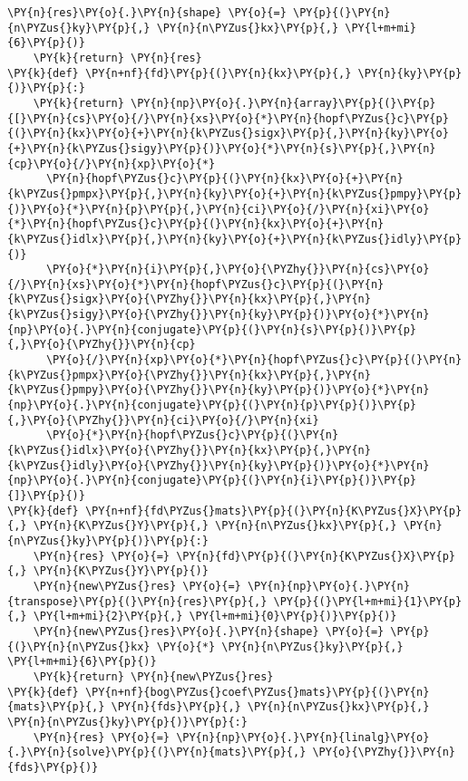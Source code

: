 \begin{Verbatim}[commandchars=\\\{\}]
    \PY{n}{res}\PY{o}{.}\PY{n}{shape} \PY{o}{=} \PY{p}{(}\PY{n}{n\PYZus{}ky}\PY{p}{,} \PY{n}{n\PYZus{}kx}\PY{p}{,} \PY{l+m+mi}{6}\PY{p}{)}
    \PY{k}{return} \PY{n}{res}
\PY{k}{def} \PY{n+nf}{fd}\PY{p}{(}\PY{n}{kx}\PY{p}{,} \PY{n}{ky}\PY{p}{)}\PY{p}{:}
    \PY{k}{return} \PY{n}{np}\PY{o}{.}\PY{n}{array}\PY{p}{(}\PY{p}{[}\PY{n}{cs}\PY{o}{/}\PY{n}{xs}\PY{o}{*}\PY{n}{hopf\PYZus{}c}\PY{p}{(}\PY{n}{kx}\PY{o}{+}\PY{n}{k\PYZus{}sigx}\PY{p}{,}\PY{n}{ky}\PY{o}{+}\PY{n}{k\PYZus{}sigy}\PY{p}{)}\PY{o}{*}\PY{n}{s}\PY{p}{,}\PY{n}{cp}\PY{o}{/}\PY{n}{xp}\PY{o}{*}
      \PY{n}{hopf\PYZus{}c}\PY{p}{(}\PY{n}{kx}\PY{o}{+}\PY{n}{k\PYZus{}pmpx}\PY{p}{,}\PY{n}{ky}\PY{o}{+}\PY{n}{k\PYZus{}pmpy}\PY{p}{)}\PY{o}{*}\PY{n}{p}\PY{p}{,}\PY{n}{ci}\PY{o}{/}\PY{n}{xi}\PY{o}{*}\PY{n}{hopf\PYZus{}c}\PY{p}{(}\PY{n}{kx}\PY{o}{+}\PY{n}{k\PYZus{}idlx}\PY{p}{,}\PY{n}{ky}\PY{o}{+}\PY{n}{k\PYZus{}idly}\PY{p}{)}
      \PY{o}{*}\PY{n}{i}\PY{p}{,}\PY{o}{\PYZhy{}}\PY{n}{cs}\PY{o}{/}\PY{n}{xs}\PY{o}{*}\PY{n}{hopf\PYZus{}c}\PY{p}{(}\PY{n}{k\PYZus{}sigx}\PY{o}{\PYZhy{}}\PY{n}{kx}\PY{p}{,}\PY{n}{k\PYZus{}sigy}\PY{o}{\PYZhy{}}\PY{n}{ky}\PY{p}{)}\PY{o}{*}\PY{n}{np}\PY{o}{.}\PY{n}{conjugate}\PY{p}{(}\PY{n}{s}\PY{p}{)}\PY{p}{,}\PY{o}{\PYZhy{}}\PY{n}{cp}
      \PY{o}{/}\PY{n}{xp}\PY{o}{*}\PY{n}{hopf\PYZus{}c}\PY{p}{(}\PY{n}{k\PYZus{}pmpx}\PY{o}{\PYZhy{}}\PY{n}{kx}\PY{p}{,}\PY{n}{k\PYZus{}pmpy}\PY{o}{\PYZhy{}}\PY{n}{ky}\PY{p}{)}\PY{o}{*}\PY{n}{np}\PY{o}{.}\PY{n}{conjugate}\PY{p}{(}\PY{n}{p}\PY{p}{)}\PY{p}{,}\PY{o}{\PYZhy{}}\PY{n}{ci}\PY{o}{/}\PY{n}{xi}
      \PY{o}{*}\PY{n}{hopf\PYZus{}c}\PY{p}{(}\PY{n}{k\PYZus{}idlx}\PY{o}{\PYZhy{}}\PY{n}{kx}\PY{p}{,}\PY{n}{k\PYZus{}idly}\PY{o}{\PYZhy{}}\PY{n}{ky}\PY{p}{)}\PY{o}{*}\PY{n}{np}\PY{o}{.}\PY{n}{conjugate}\PY{p}{(}\PY{n}{i}\PY{p}{)}\PY{p}{]}\PY{p}{)}
\PY{k}{def} \PY{n+nf}{fd\PYZus{}mats}\PY{p}{(}\PY{n}{K\PYZus{}X}\PY{p}{,} \PY{n}{K\PYZus{}Y}\PY{p}{,} \PY{n}{n\PYZus{}kx}\PY{p}{,} \PY{n}{n\PYZus{}ky}\PY{p}{)}\PY{p}{:}
    \PY{n}{res} \PY{o}{=} \PY{n}{fd}\PY{p}{(}\PY{n}{K\PYZus{}X}\PY{p}{,} \PY{n}{K\PYZus{}Y}\PY{p}{)}
    \PY{n}{new\PYZus{}res} \PY{o}{=} \PY{n}{np}\PY{o}{.}\PY{n}{transpose}\PY{p}{(}\PY{n}{res}\PY{p}{,} \PY{p}{(}\PY{l+m+mi}{1}\PY{p}{,} \PY{l+m+mi}{2}\PY{p}{,} \PY{l+m+mi}{0}\PY{p}{)}\PY{p}{)}
    \PY{n}{new\PYZus{}res}\PY{o}{.}\PY{n}{shape} \PY{o}{=} \PY{p}{(}\PY{n}{n\PYZus{}kx} \PY{o}{*} \PY{n}{n\PYZus{}ky}\PY{p}{,} \PY{l+m+mi}{6}\PY{p}{)}
    \PY{k}{return} \PY{n}{new\PYZus{}res}
\PY{k}{def} \PY{n+nf}{bog\PYZus{}coef\PYZus{}mats}\PY{p}{(}\PY{n}{mats}\PY{p}{,} \PY{n}{fds}\PY{p}{,} \PY{n}{n\PYZus{}kx}\PY{p}{,} \PY{n}{n\PYZus{}ky}\PY{p}{)}\PY{p}{:}
    \PY{n}{res} \PY{o}{=} \PY{n}{np}\PY{o}{.}\PY{n}{linalg}\PY{o}{.}\PY{n}{solve}\PY{p}{(}\PY{n}{mats}\PY{p}{,} \PY{o}{\PYZhy{}}\PY{n}{fds}\PY{p}{)}

\end{Verbatim}

